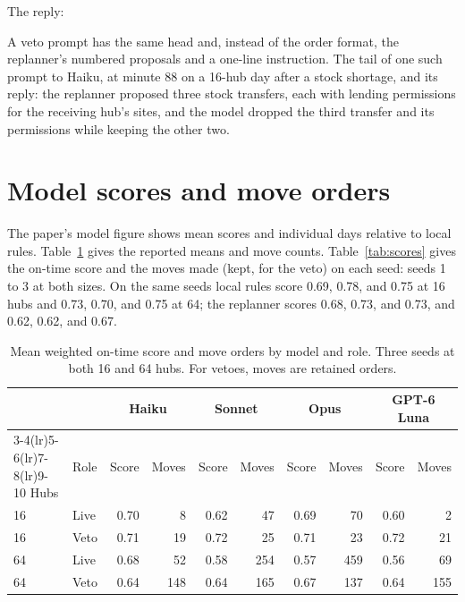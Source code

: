 \documentclass[conference]{IEEEtran}
\begin{document}
The reply:



A veto prompt has the same head and, instead of the order format, the
replanner's numbered proposals and a one-line instruction. The tail of one
such prompt to Haiku, at minute 88 on a 16-hub day after a stock shortage,
and its reply: the replanner proposed three stock transfers, each with
lending permissions for the receiving hub's sites, and the model dropped
the third transfer and its permissions while keeping the other two.





\section{Model scores and move orders}
\label{app:scores}

The paper's model figure shows mean scores and individual days relative
to local rules. Table~\ref{tab:model-means} gives the reported means and
move counts. Table~\ref{tab:scores} gives the on-time score
and the moves made (kept, for the veto) on each seed: seeds
1 to 3 at both sizes. On the same seeds local rules score
0.69, 0.78, and 0.75 at 16 hubs and 0.73, 0.70, and 0.75 at 64; the
replanner scores 0.68, 0.73, and 0.73, and 0.62, 0.62, and 0.67.

\begin{table}[h]
\caption{Mean weighted on-time score and move orders by model and role.
Three seeds at both 16 and 64 hubs. For vetoes, moves are retained orders.}
\label{tab:model-means}
\centering
\begin{tabular}{llrrrrrrrr}
\toprule
& & \multicolumn{2}{c}{Haiku} & \multicolumn{2}{c}{Sonnet} & \multicolumn{2}{c}{Opus} & \multicolumn{2}{c}{GPT-6 Luna} \\
\cmidrule(lr){3-4}\cmidrule(lr){5-6}\cmidrule(lr){7-8}\cmidrule(lr){9-10}
Hubs & Role & Score & Moves & Score & Moves & Score & Moves & Score & Moves \\
\midrule
16 & Live & 0.70 & 8 & 0.62 & 47 & 0.69 & 70 & 0.60 & 2 \\
16 & Veto & 0.71 & 19 & 0.72 & 25 & 0.71 & 23 & 0.72 & 21 \\
64 & Live & 0.68 & 52 & 0.58 & 254 & 0.57 & 459 & 0.56 & 69 \\
64 & Veto & 0.64 & 148 & 0.64 & 165 & 0.67 & 137 & 0.64 & 155 \\
\bottomrule
\end{tabular}
\end{table}
\end{document}
